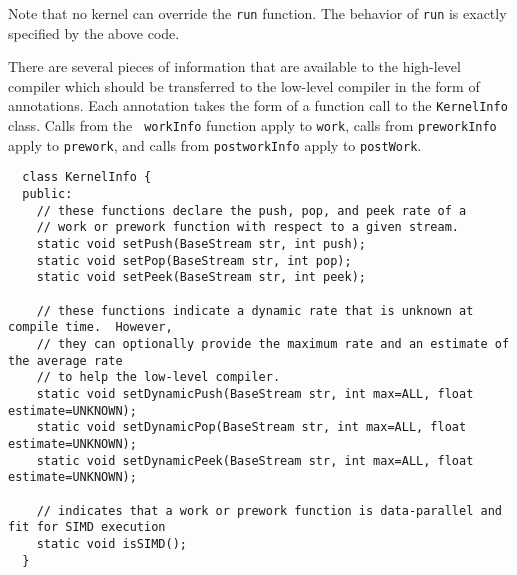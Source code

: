 Note that no kernel can override the {\tt run} function.  The behavior
of {\tt run} is exactly specified by the above code.


There are several pieces of information that are available to the
high-level compiler which should be transferred to the low-level
compiler in the form of annotations.  Each annotation takes the form
of a function call to the {\tt KernelInfo} class.  Calls from the {\tt
workInfo} function apply to {\tt work}, calls from {\tt preworkInfo}
apply to {\tt prework}, and calls from {\tt postworkInfo} apply to
{\tt postWork}.
{\small
\begin{verbatim}
  class KernelInfo {
  public:
    // these functions declare the push, pop, and peek rate of a
    // work or prework function with respect to a given stream.
    static void setPush(BaseStream str, int push);
    static void setPop(BaseStream str, int pop);
    static void setPeek(BaseStream str, int peek);

    // these functions indicate a dynamic rate that is unknown at compile time.  However, 
    // they can optionally provide the maximum rate and an estimate of the average rate 
    // to help the low-level compiler.
    static void setDynamicPush(BaseStream str, int max=ALL, float estimate=UNKNOWN);
    static void setDynamicPop(BaseStream str, int max=ALL, float estimate=UNKNOWN);
    static void setDynamicPeek(BaseStream str, int max=ALL, float estimate=UNKNOWN);

    // indicates that a work or prework function is data-parallel and fit for SIMD execution
    static void isSIMD();
  }  
\end{verbatim}}

